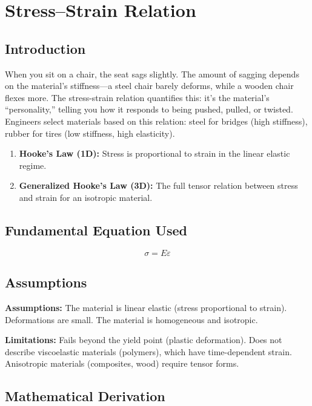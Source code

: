 \chapter{Stress--Strain Relation}

\section*{Introduction}

When you sit on a chair, the seat sags slightly. The amount of sagging depends on the material's stiffness---a steel chair barely deforms, while a wooden chair flexes more. The stress-strain relation quantifies this: it's the material's ``personality,'' telling you how it responds to being pushed, pulled, or twisted. Engineers select materials based on this relation: steel for bridges (high stiffness), rubber for tires (low stiffness, high elasticity).

\begin{enumerate}
\item \textbf{Hooke's Law (1D):} Stress is proportional to strain in the linear elastic regime.

\item \textbf{Generalized Hooke's Law (3D):} The full tensor relation between stress and strain for an isotropic material.

\end{enumerate}
\section*{Fundamental Equation Used}

\[
\sigma = E\varepsilon
\]


\section*{Assumptions}

\textbf{Assumptions:} The material is linear elastic (stress proportional to strain). Deformations are small. The material is homogeneous and isotropic.


\textbf{Limitations:} Fails beyond the yield point (plastic deformation). Does not describe viscoelastic materials (polymers), which have time-dependent strain. Anisotropic materials (composites, wood) require tensor forms.


\section*{Mathematical Derivation}

